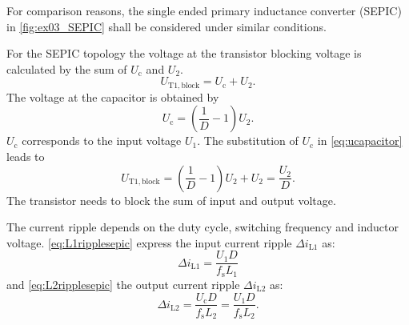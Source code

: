 \vspace{2em}\par
For comparison reasons, the single ended primary inductance converter (SEPIC) in \autoref{fig:ex03_SEPIC} shall be considered under similar conditions.



\begin{solutionblock}
    For the SEPIC topology the voltage at the transistor blocking voltage is calculated by the sum of 
    $U_\mathrm{c}$ and $U_\mathrm{2}$.
    \begin{equation}
        U_\mathrm{T1,block}=U_\mathrm{c}+U_\mathrm{2}.
    \end{equation}
    The voltage at the capacitor is obtained by
    \begin{equation}
        U_\mathrm{c}=\left( \frac{1}{D}-1\right) U_\mathrm{2}.
        \label{eq:ucapacitor}        
    \end{equation}
    $U_\mathrm{c}$ corresponds to the input voltage $U_\mathrm{1}$. The substitution of $U_\mathrm{c}$ in \eqref{eq:ucapacitor} leads to 
    \begin{equation}
        U_\mathrm{T1,block}=\left( \frac{1}{D}-1\right) U_\mathrm{2}+U_\mathrm{2}=\frac{U_\mathrm{2}}{D}.
    \end{equation}
    The transistor needs to block the sum of input and output voltage.
\end{solutionblock}

\begin{solutionblock}
    The current ripple depends on the duty cycle, switching frequency and inductor voltage.
    \eqref{eq:L1ripplesepic} express the input current ripple $\Delta i_\mathrm{L1}$ as:
    \begin{equation}
        \Delta i_\mathrm{L1}=\frac{U_\mathrm{1}D}{f_\mathrm{s}L_\mathrm{1}}
        \label{eq:L1ripplesepic}
    \end{equation}
    and \eqref{eq:L2ripplesepic} the output current ripple $\Delta i_\mathrm{L2}$ as:
    \begin{equation}
        \Delta i_\mathrm{L2}=\frac{U_\mathrm{c}D}{f_\mathrm{s}L_\mathrm{2}}
        =\frac{U_\mathrm{1}D}{f_\mathrm{s}L_\mathrm{2}}.
        \label{eq:L2ripplesepic}
    \end{equation}
\end{solutionblock}

